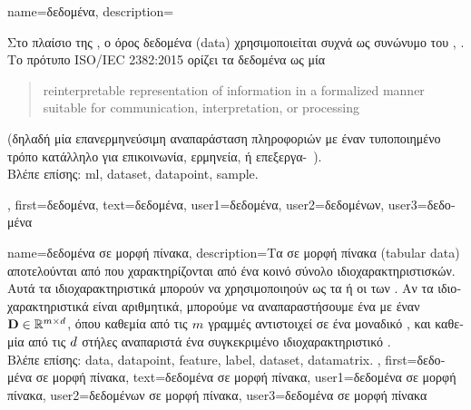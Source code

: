 {name={\foreignlanguage{greek}{δεδομένα}},
	 description={\foreignlanguage{greek}{Στο πλαίσιο της} , \foreignlanguage{greek}{ο όρος δεδομένα}  
 		(data) \foreignlanguage{greek}{χρησιμοποιείται συχνά ως συνώνυμο του}
		 \cite{Everitt2010}, \cite{OxfordStatisticsDictionary}. 
  		\foreignlanguage{greek}{Το πρότυπο} ISO/IEC 2382:2015 \cite{ISO2382} \foreignlanguage{greek}{ορίζει τα δεδομένα ως μία}
		\begin{quote} reinterpretable representation of information in a formalized manner suitable for communication, interpretation, 
  		or processing \end{quote}
		\foreignlanguage{greek}{(δηλαδή μία} \foreignlanguage{greek}{\guillemotleft επανερμηνεύσιμη αναπαράσταση πληροφοριών 
		με έναν τυποποιημένο τρόπο κατάλληλο για επικοινωνία, ερμηνεία, ή επεξεργα-\guillemotright\ }).
		\\
		\foreignlanguage{greek}{Βλέπε επίσης:} \gls{ml}, \gls{dataset}, \gls{datapoint}, \gls{sample}.}, 
	first={\foreignlanguage{greek}{δεδομένα}},
	text={\foreignlanguage{greek}{δεδομένα}},
	user1={\foreignlanguage{greek}{δεδομένα}}, %
  	user2={\foreignlanguage{greek}{δεδομένων}}, %
	user3={\foreignlanguage{greek}{δεδομένα}} %
}

{name={\foreignlanguage{greek}{δεδομένα σε μορφή πίνακα}},
	description={\foreignlanguage{greek}{Τα}  
		\foreignlanguage{greek}{σε μορφή πίνακα} (tabular data) \foreignlanguage{greek}{αποτελούνται από}  
		\foreignlanguage{greek}{που χαρακτηρίζονται από ένα κοινό σύνολο ιδιοχαρακτηριστισκών. Αυτά τα ιδιοχαρακτηριστικά  
		μπορούν να χρησιμοποιηούν ως τα}  \foreignlanguage{greek}{ή οι}  \foreignlanguage{greek}{των} 
		. \foreignlanguage{greek}{Αν τα ιδιοχαρακτηριστικά είναι αριθμητικά, μπορούμε να αναπαραστήσουμε ένα}
		 \foreignlanguage{greek}{με έναν}  $\mathbf{D} \in \mathbb{R}^{m \times d}$, 
		\foreignlanguage{greek}{όπου καθεμία από τις $m$ γραμμές αντιστοιχεί σε ένα μοναδικό} ,
		\foreignlanguage{greek}{και καθεμία από τις $d$ στήλες αναπαριστά ένα συγκεκριμένο ιδιοχαρακτηριστικό} \cite{Everitt2022}.
		\\
		\foreignlanguage{greek}{Βλέπε επίσης:} \gls{data}, \gls{datapoint}, \gls{feature}, \gls{label}, \gls{dataset}, \gls{datamatrix}. }, 
	first={\foreignlanguage{greek}{δεδομένα σε μορφή πίνακα}},
	text={\foreignlanguage{greek}{δεδομένα σε μορφή πίνακα}},
	user1={\foreignlanguage{greek}{δεδομένα σε μορφή πίνακα}}, %
  	user2={\foreignlanguage{greek}{δεδομένων σε μορφή πίνακα}}, %
	user3={\foreignlanguage{greek}{δεδομένα σε μορφή πίνακα}} %
}

